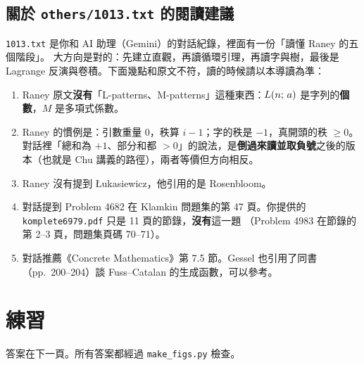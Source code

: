\subsection{關於 \texttt{others/1013.txt} 的閱讀建議}

\texttt{1013.txt} 是你和 AI 助理（Gemini）的對話紀錄，裡面有一份「讀懂 Raney 的五個階段」。
大方向是對的：先建立直觀，再讀循環引理，再讀字與樹，最後是 Lagrange 反演與卷積。下面幾點和原文不符，讀的時候請以本導讀為準：
\begin{enumerate}[leftmargin=1.6em]
  \item Raney 原文\textbf{沒有}「L-patterns、M-patterns」這種東西：$L(n;\,a)$ 是字列的\textbf{個數}，$M$ 是多項式係數。
  \item Raney 的慣例是：引數重量 0，秩算 $i-1$；字的秩是 $-1$，真開頭的秩 $\ge0$。
        對話裡「總和為 $+1$、部分和都 $>0$」的說法，是\textbf{倒過來讀並取負號}之後的版本（也就是 Chu 講義的路徑），兩者等價但方向相反。
  \item Raney 沒有提到 Łukasiewicz，他引用的是 Rosenbloom。
  \item 對話提到 Problem 4682 在 Klamkin 問題集的第 47 頁。你提供的 \texttt{komplete6979.pdf} 只是 11 頁的節錄，\textbf{沒有}這一題
        （Problem 4983 在節錄的第 2--3 頁，問題集頁碼 70--71）。
  \item 對話推薦《Concrete Mathematics》第 7.5 節。Gessel 也引用了同書（pp.~200--204）談 Fuss--Catalan 的生成函數，可以參考。
\end{enumerate}

\section{練習}\label{sec:exercises}

答案在下一頁。所有答案都經過 \texttt{make\_figs.py} 檢查。

